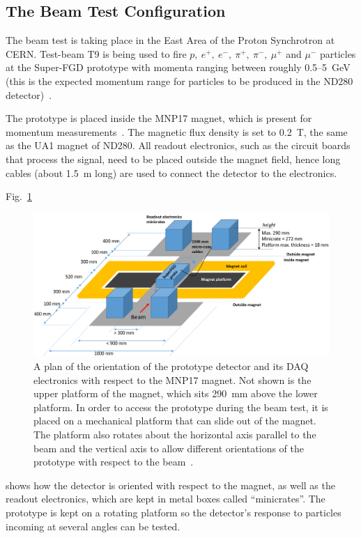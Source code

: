 \documentclass[aps,pra,12pt,notitlepage,tightenlines]{revtex4-1}
\begin{document}
\subsection{The Beam Test Configuration}
The beam test is taking place in the East Area of the Proton Synchrotron at CERN. Test-beam T9 is being used to fire $p, \ e^+, \ e^-, \ \pi^+, \ \pi^-, \ \mu^+$ and $\mu^-$ particles at the Super-FGD prototype with momenta ranging between roughly 0.5--5~GeV (this is the expected momentum range for particles to be produced in the ND280 detector)~\cite{Durieu2001}. 

The prototype is placed inside the MNP17 magnet, which is present for momentum measurements~\cite{Brooks2015}. The magnetic flux density is set to 0.2~T, the same as the UA1 magnet of ND280. All readout electronics, such as the circuit boards that process the signal, need to be placed outside the magnet field, hence long cables (about 1.5~m long) are used to connect the detector to the electronics. 

Fig.~\ref{fig:plat}
\begin{figure}
 \includegraphics[scale=0.4]{platform2}
 \caption{A plan of the orientation of the prototype detector and its DAQ electronics with respect to the MNP17 magnet. Not shown is the upper platform of the magnet, which sits 290~mm above the lower platform. In order to access the prototype during the beam test, it is placed on a mechanical platform that can slide out of the magnet. The platform also rotates about the horizontal axis parallel to the beam and the vertical axis to allow different orientations of the prototype with respect to the beam~\cite{Cadoux2018}.}
 \label{fig:plat}
\end{figure}
shows how the detector is oriented with respect to the magnet, as well as the readout electronics, which are kept in metal boxes called ``minicrates''. The prototype is kept on a rotating platform so the detector's response to particles incoming at several angles can be tested.
\end{document}
